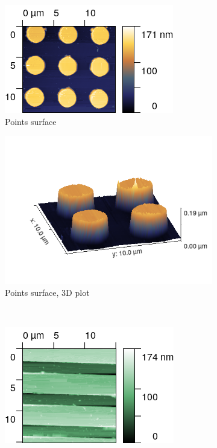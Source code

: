 \documentclass[11pt,a4paper]{article}
\begin{document}
\begin{figure}[H]
\centering
\begin{subfigure}[b]{0.42\textwidth}
\includegraphics[width=\textwidth]{tm_points}
\caption{Points surface}
\label{fig:}
\end{subfigure}
\begin{subfigure}[b]{0.42\textwidth}
\includegraphics[width=\textwidth]{tm_points_3D}
\caption{Points surface, 3D plot}
\label{fig:sm_raws}
\end{subfigure}\\\vspace{.2cm}
\begin{subfigure}[b]{0.42\textwidth}
\includegraphics[width=\textwidth]{tm_raws}

\end{subfigure}
\end{figure}
\end{document}
